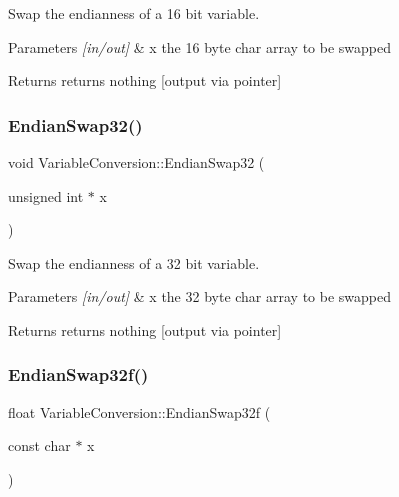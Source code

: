 Swap the endianness of a 16 bit variable. 


\begin{DoxyParams}{Parameters}
{\em \mbox{[}in/out\mbox{]}} & x the 16 byte char array to be swapped\\
\hline
\end{DoxyParams}
\begin{DoxyReturn}{Returns}
returns nothing \mbox{[}output via pointer\mbox{]} 
\end{DoxyReturn}
\mbox{\label{class_variable_conversion_a7ee01caff268378f05f985aea3c3d632}} 
\subsubsection{\texorpdfstring{EndianSwap32()}{EndianSwap32()}}
{\footnotesize\ttfamily void Variable\+Conversion\+::\+Endian\+Swap32 (\begin{DoxyParamCaption}\item[{unsigned int $\ast$}]{x }\end{DoxyParamCaption})\hspace{0.3cm}{\ttfamily [inline]}}



Swap the endianness of a 32 bit variable. 


\begin{DoxyParams}{Parameters}
{\em \mbox{[}in/out\mbox{]}} & x the 32 byte char array to be swapped\\
\hline
\end{DoxyParams}
\begin{DoxyReturn}{Returns}
returns nothing \mbox{[}output via pointer\mbox{]} 
\end{DoxyReturn}
\mbox{\label{class_variable_conversion_a148552cb5b64d68c2ab2a70727ebcafb}} 
\subsubsection{\texorpdfstring{EndianSwap32f()}{EndianSwap32f()}}
{\footnotesize\ttfamily float Variable\+Conversion\+::\+Endian\+Swap32f (\begin{DoxyParamCaption}\item[{const char $\ast$}]{x }\end{DoxyParamCaption})\hspace{0.3cm}{\ttfamily [inline]}}




